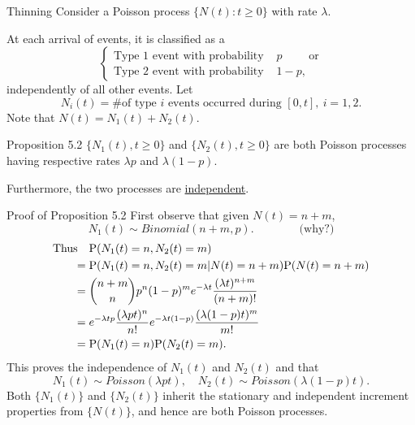 \documentclass[letterpaper,handout, mathserif]{beamer}
\def\p{\mathrm P}
\begin{document}
\begin{frame}{Thinning}
Consider a Poisson process $\{N(t): t\ge 0\}$ with rate $\lambda$.\par
At each arrival of events, it is classified as a
$$
\begin{cases}
\mbox{Type 1 event with probability }& p\qquad \mbox{ or}\\
\mbox{Type 2 event with probability }&1-p,
\end{cases}
$$
independently of all other events.
Let $$N_i(t)= \mbox{\# of type }i \mbox{ events occurred during }[0, t], \ i = 1,2.$$
Note that $N(t) = N_1(t) +N_2(t)$.\bigskip

\begin{block}{Proposition 5.2}
$\{N_1(t), t \ge0\}$ and $\{N_2(t), t\ge 0\}$ are both Poisson processes
having respective rates $\lambda p$ and $\lambda (1 - p)$.\par\smallskip
Furthermore, the two processes are \underline{independent}.
\end{block}
\end{frame}
\begin{frame}{Proof of Proposition 5.2}
First observe that given $N(t)=n+m$,
$$N_1(t)\sim Binomial(n+m,p).\qquad\qquad\mbox{(why?)}$$
\begin{align*}
\mbox{Thus\quad }&\p(N_1(t)=n,N_2(t)=m)\\
={}&\p(N_1(t)=n,N_2(t)=m|N(t)=n+m)\p(N(t)=n+m)\\
={}&{n+m\choose n}p^n(1-p)^m e^{-\lambda t}\frac{(\lambda t)^{n+m}}{(n+m)!}\\
={}&e^{-\lambda tp}\frac{(\lambda pt)^{n}}{n!}e^{-\lambda t(1-p)}\frac{(\lambda (1-p)t)^{m}}{m!}\\
={}&\p(N_1(t)=n)\p(N_2(t)=m).
\end{align*}
This proves the independence of $N_1(t)$ and $N_2(t)$ and that
$$N_1(t)\sim Poisson(\lambda p t),\quad N_2(t)\sim Poisson(\lambda (1-p)t).$$
Both $\{N_1(t)\}$ and $\{N_2(t)\}$ inherit the stationary and independent increment properties  from $\{N(t)\}$, and hence are both Poisson processes.
\end{frame}
\end{document}

